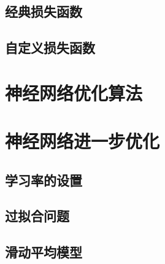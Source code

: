 \documentclass{article}\usepackage{float}\usepackage{listings} \usepackage{braket} \usepackage{amsmath,amssymb} \usepackage{geometry} \usepackage{graphicx} \usepackage{fancyvrb}\usepackage{braket} \usepackage{bm}\usepackage{hyperref} \usepackage{CJKutf8} \geometry{left=0.2cm,right=0.2cm,top=0.2cm,bottom=0.2cm} \renewcommand{\theequation}{\arabic{section}.\arabic{equation}} \renewcommand{\baselinestretch}{1.5}
\begin{document}
\begin{CJK}{UTF8}{gbsn}
\subsection{经典损失函数}
\label{sec:org5239194}
\subsection{自定义损失函数}
\label{sec:org2b3e954}

\section{神经网络优化算法}
\label{sec:org90a2418}
\section{神经网络进一步优化}
\label{sec:org5f20e0b}

\subsection{学习率的设置}
\label{sec:org11bb285}

\subsection{过拟合问题}
\label{sec:org9516d59}

\subsection{滑动平均模型}
\label{sec:org8864399}
  
  
\end{CJK}
\end{document}
